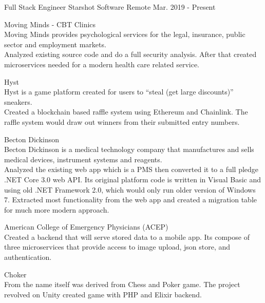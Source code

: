 
\begin{cventries}
    \cventry
        {Full Stack Engineer}
        {Starshot Software}
        {Remote}
        {Mar. 2019 - Present}
        {
            \begin{cvitems}
                \item
                    {Moving Minds - CBT Clinics\\
                    Moving Minds provides psychological services for the legal, insurance, public sector and employment markets.\\
                    Analyzed existing source code and do a full security analysis. After that created microservices needed for a modern health care related service.}
                \item
                    {Hyst\\
                    Hyst is a game platform created for users to “steal (get large discounts)” sneakers.\\
                    Created a blockchain based raffle system using Ethereum and Chainlink. The raffle system would draw out winners from their submitted entry numbers.}
                \item
                    {Becton Dickinson\\
                    Becton Dickinson is a medical technology company that manufactures and sells medical devices, instrument systems and reagents.\\
                    Analyzed the existing web app which is a PMS then converted it to a full pledge .NET Core 3.0 web API. Its original platform code is written in Visual Basic and using old .NET Framework 2.0, which would only run older version of Windows 7. Extracted most functionality from the web app and created a migration table for much more modern approach.}
                \item
                    {American College of Emergency Physicians (ACEP)\\
                    Created a backend that will serve stored data to a mobile app. Its compose of three microservices that provide access to image upload, json store, and authentication.}
                \item
                    {Choker\\
                    From the name itself was derived from Chess and Poker game. The project revolved on Unity created game with PHP and Elixir backend.\\
}
\end{cvitems}}
\end{cventries}
